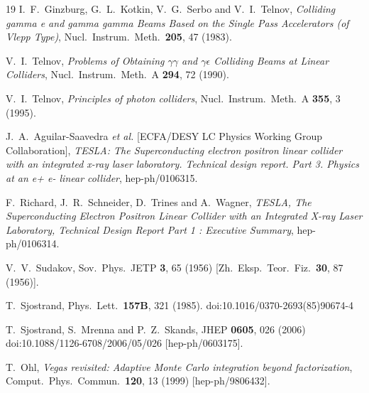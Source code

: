 \documentclass[12pt]{book}
\begin{document}
\begin{thebibliography}{19}
  I.~F.~Ginzburg, G.~L.~Kotkin, V.~G.~Serbo and V.~I.~Telnov,
  {\em Colliding gamma e and gamma gamma Beams Based on the Single
    Pass Accelerators (of Vlepp Type)},
  Nucl.\ Instrum.\ Meth.\  {\bf 205}, 47 (1983).

  V.~I.~Telnov,
  {\em Problems of Obtaining $\gamma \gamma$ and $\gamma \epsilon$
    Colliding Beams at Linear Colliders},
  Nucl.\ Instrum.\ Meth.\ A {\bf 294}, 72 (1990).

  V.~I.~Telnov,
  {\em Principles of photon colliders},
  Nucl.\ Instrum.\ Meth.\ A {\bf 355}, 3 (1995).

  J.~A.~Aguilar-Saavedra {\it et al.}  [ECFA/DESY LC Physics Working
  Group Collaboration],
  {\em TESLA: The Superconducting electron positron linear collider
    with an integrated x-ray laser laboratory. Technical design
    report. Part 3. Physics at an e+ e- linear collider},
  hep-ph/0106315.

  F.~Richard, J.~R.~Schneider, D.~Trines and A.~Wagner,
  {\em TESLA, The Superconducting Electron Positron Linear Collider
    with an Integrated X-ray Laser Laboratory, Technical Design Report
    Part 1 : Executive Summary},
  hep-ph/0106314.

  V.~V.~Sudakov,
  Sov.\ Phys.\ JETP {\bf 3}, 65 (1956)
  [Zh.\ Eksp.\ Teor.\ Fiz.\  {\bf 30}, 87 (1956)].

\cite{Sjostrand:1985xi}
  T.~Sjostrand,
  Phys.\ Lett.\  {\bf 157B}, 321 (1985).
  doi:10.1016/0370-2693(85)90674-4

  T.~Sjostrand, S.~Mrenna and P.~Z.~Skands,
  JHEP {\bf 0605}, 026 (2006)
  doi:10.1088/1126-6708/2006/05/026
  [hep-ph/0603175].

  T.~Ohl,
  {\em Vegas revisited: Adaptive Monte Carlo integration beyond
    factorization},
  Comput.\ Phys.\ Commun.\  {\bf 120}, 13 (1999)
  [hep-ph/9806432].


\end{thebibliography}
\end{document}
